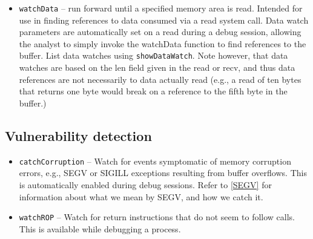 \documentclass[titlepage]{article}
\begin{document}
\begin{itemize}
\item {\tt watchData} – run forward until a specified memory area is read.  Intended for use in finding references to data consumed via a read system call.  Data watch parameters are automatically set on a read during a debug session, allowing the analyst to simply invoke the watchData function to find references to the buffer.  List data watches using {\tt showDataWatch}.
Note however, that data watches are based on the len field given in the read or recv, and thus data references are not necessarily to data actually read (e.g., a read of ten bytes
that returns one byte would break on a reference to the fifth byte in the buffer.)

\end{itemize}

\subsection{Vulnerability detection}
\begin{itemize}
\item {\tt catchCorruption} – Watch for events symptomatic of memory corruption errors, e.g., SEGV or SIGILL exceptions resulting from buffer overflows.  This is automatically enabled during debug sessions. Refer to \ref{SEGV} for information about what we mean by SEGV, and how we catch it.

\item {\tt watchROP} -- Watch for return instructions that do not seem to follow calls.  This is available while debugging a process.
\end{itemize}
\end{document}
